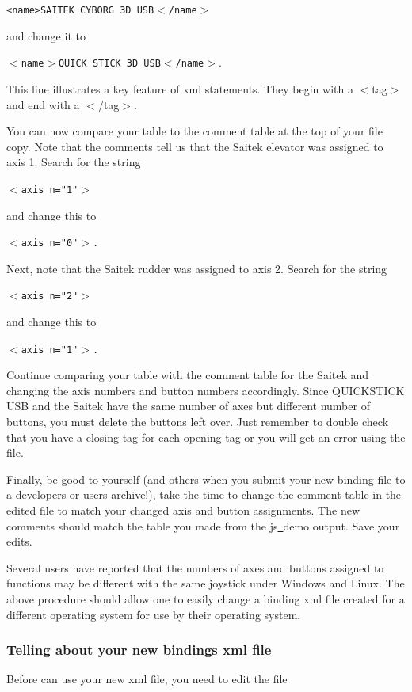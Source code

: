 \texttt{<name>SAITEK CYBORG 3D USB$<$/name$>$}
\medskip

\noindent
and change it to
\medskip

	\texttt{$<$name$>$QUICK STICK 3D USB$<$/name$>$}.
	\medskip

\noindent
This line illustrates a key feature of xml statements.  They begin with a $<$tag$>$ and end with a $<$/tag$>$.  

You can now compare your table to the comment table at the top of your file copy.  Note that the comments tell us that the Saitek elevator was assigned to axis 1.  Search for the string
\medskip

	\texttt{$<$axis n="1"$>$}
\medskip

\noindent	
and change this to 
\medskip

	\texttt{$<$axis n="0"$>$.}
\medskip	

Next, note that the Saitek rudder was assigned to axis 2.  Search for the string
\medskip

	\texttt{$<$axis n="2"$>$}

\noindent	
and change this to 
\medskip
	
	\texttt{$<$axis n="1"$>$.}
\medskip

\noindent	
Continue comparing your table with the comment table for the Saitek and changing the axis numbers and button numbers accordingly.  Since QUICKSTICK USB and the Saitek have the same number of axes but different number of buttons, you must delete the buttons left over.  Just remember to double check that you have a closing tag for each opening tag or you will get an error using the file.

Finally, be good to yourself (and others when you submit your new binding file to a \FlightGear{} developers or users archive!), take the time to change the comment table in the edited file to match your changed axis and button assignments.  The new comments should match the table you made from the js\underline{~}demo output.  Save your edits.

Several users have reported that the numbers of axes and buttons assigned to functions may be different with the same joystick under Windows and Linux.  The above procedure should allow one to easily change a binding xml file created for a different operating system for use by their operating system.

\subsubsection{Telling \FlightGear{} about your new bindings xml file\label{telling}}
Before \FlightGear{} can use your new xml file, you need to edit the file


